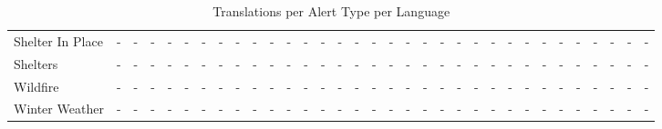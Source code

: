\begin{table}[H]
\begin{tabular}{|l|c|c|c|c|c|c|c|c|c|c|c|c|c|c|c|c|c|c|c|c|c|c|c|c|c|c|c|c|c|c|c|c|}
Shelter In Place & - & - & - & - & - & - & - & - & - & - & - & - & - & - & - & - & - & - & - & - & - & - & - & - & - & - & - & - & - & - & - & - \\
Shelters & - & - & - & - & - & - & - & - & - & - & - & - & - & - & - & - & - & - & - & - & - & - & - & - & - & - & - & - & - & - & - & - \\
Wildfire & - & - & - & - & - & - & - & - & - & - & - & - & - & - & - & - & - & - & - & - & - & - & - & - & - & - & - & - & - & - & - & - \\
Winter Weather & - & - & - & - & - & - & - & - & - & - & - & - & - & - & - & - & - & - & - & - & - & - & - & - & - & - & - & - & - & - & - & - \\
\hline
\end{tabular}
\caption{Translations per Alert Type per Language}
\label{tab:portland_data_translations}
\end{table}